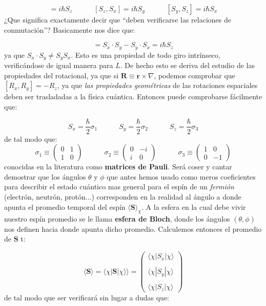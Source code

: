 \documentclass[12pt]{article}
\newcommand{\tquad}{\quad \quad \quad}
\newcommand{\rn}{\mathbf{r}}
\newcommand{\Rn}{\mathbf{R}}
\newcommand{\Sn}{\mathbf{S}}
\begin{document}
\begin{equation}
[S_x,S_z] = i \hbar S_z \tquad [S_z,S_x] = i \hbar S_y \tquad [S_y,S_z] = i \hbar S_x
\end{equation} 
¿Que significa exactamente decir que ``deben verificarse las relaciones de conmutación''? Basicamente nos dice que:

\begin{equation}
[S_x,S_y] = S_x \cdot S_y - S_y \cdot S_x = i \hbar S_z
\end{equation}
ya que $S_x \cdot S_y \neq S_y S_x$. Esto es una propiedad de todo giro intrínseco, verificándose de igual manera para $L$. De hecho esto se deriva del estudio de las propiedades del rotacional, ya que si $\Rn \equiv \rn \times \nabla$, podemos comprobar que $[R_x,R_y] =  - R_z$, ya que \textit{las propiedades geométricas} de las rotaciones espaciales deben ser trasladadas a la física cuántica. Entonces puede comprobarse fácilmente que:

\begin{equation}
S_x =  \dfrac{\hbar}{2} \sigma_1 \tquad S_y = \dfrac{\hbar}{2} \sigma_2 \tquad S_z =\dfrac{\hbar}{2} \sigma_3
\end{equation}
de tal modo que:
\begin{equation}
\sigma_1 \equiv \begin{pmatrix}
0 & 1 \\
1 & 0 
\end{pmatrix}
\tquad 
\sigma_2 \equiv \begin{pmatrix}
0 & -i \\
i & 0 
\end{pmatrix} \tquad
\sigma_3 \equiv \begin{pmatrix}
1 &  0  \\
0 & -1 
\end{pmatrix}
\end{equation}
conocidas en la literatura como \textbf{matrices de Pauli}. Será coser y cantar demostrar que los ángulos $\theta$ y $\phi$ que antes hemos usado como meros coeficientes para describir el estado cuántico mas general para el espín de un \textit{fermión} (electrón, neutrón, protón...) corresponden en la realidad al ángulo a donde apunta el promedio temporal del espín $\langle \Sn \rangle_{\chi}$. A la esfera en la cual debe vivir nuestro espín promedio se le llama \textbf{esfera de Bloch}, donde los ángulos $(\theta,\phi)$ nos definen hacia donde apunta dicho promedio. Calculemos entonces el promedio de $\Sn$ t:

\begin{equation}
\langle \Sn \rangle = \langle \chi | \Sn | \chi \rangle \rangle = \begin{pmatrix}
\langle \chi | S_x | \chi \rangle \\ \\
\langle \chi | S_y | \chi \rangle \\ \\
\langle \chi | S_z | \chi \rangle 
\end{pmatrix}
\end{equation}
de tal modo que ser verificará sin lugar a dudas que:
\end{document}
